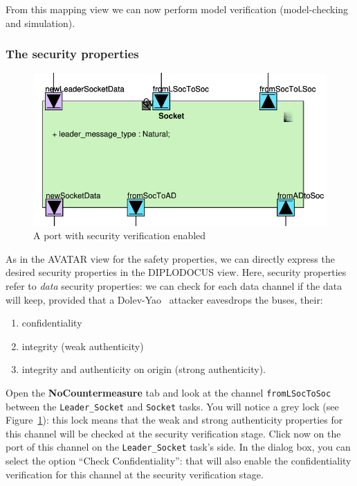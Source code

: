 \documentclass{article}
\begin{document}
From this mapping view we can now perform model verification (model-checking and simulation).

\subsubsection{The security properties}

\begin{figure}
	\centering
	\includegraphics[width=.75\textwidth]{figures/lock.pdf}
	\caption{A port with security verification enabled}
	\label{fig:lock}
\end{figure}

As in the AVATAR view for the safety properties, we can directly express the desired security properties in the DIPLODOCUS view. Here, security properties refer to \emph{data} security properties: we can check for each data channel if the data will keep, provided that a Dolev-Yao~\cite{dolevyao} attacker eavesdrops the buses, their:
\begin{enumerate}
	\item confidentiality
	\item integrity (weak authenticity)
	\item integrity and authenticity on origin (strong authenticity).
\end{enumerate}
Open the \textbf{NoCountermeasure} tab and look at the channel \texttt{fromLSocToSoc} between the \texttt{Leader\_Socket} and \texttt{Socket} tasks. You will notice a grey lock (see Figure~\ref{fig:lock}): this lock means that the weak and strong authenticity properties for this channel will be checked at the security verification stage. Click now on the port of this channel on the \texttt{Leader\_Socket} task's side. In the dialog box, you can select the option ``Check Confidentiality'': that will also enable the confidentiality verification for this channel at the security verification stage.



\end{document}

